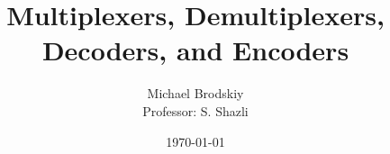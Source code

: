 


\pagestyle{fancy}

\title{Multiplexers, Demultiplexers, Decoders, and Encoders}
\date{\today}
\author{Michael Brodskiy\\ \small Professor: S. Shazli}



\maketitle

\thispagestyle{fancy}

\newpage

